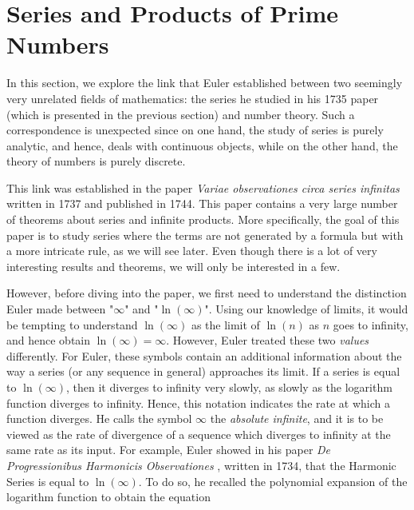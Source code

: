 \section{Series and Products of Prime Numbers}

In this section, we explore the link that Euler established between two seemingly very unrelated fields of mathematics: the series he studied in his 1735 paper (which is presented in the previous section) and number theory. Such a correspondence is unexpected since on one hand, the study of series is purely analytic, and hence, deals with continuous objects, while on the other hand, the theory of numbers is purely discrete.

This link was established in the paper \textit{Variae observationes circa series infinitas} \cite{euler1737variae} written in 1737 and published in 1744. This paper contains a very large number of theorems about series and infinite products. More specifically, the goal of this paper is to study series where the terms are not generated by a formula but with a more intricate rule, as we will see later. Even though there is a lot of very interesting results and theorems, we will only be interested in a few.

However, before diving into the paper, we first need to understand the distinction Euler made between "$\infty$" and "$\ln(\infty)$". Using our knowledge of limits, it would be tempting to understand $\ln(\infty)$ as the limit of $\ln(n)$ as $n$ goes to infinity, and hence obtain $\ln(\infty) = \infty$. However, Euler treated these two \textit{values} differently. For Euler, these symbols contain an additional information about the way a series (or any sequence in general) approaches its limit. If a series is equal to $\ln(\infty)$, then it diverges to infinity very slowly, as slowly as the logarithm function diverges to infinity. Hence, this notation indicates the rate at which a function diverges. He calls the symbol $\infty$ the \textit{absolute infinite}, and it is to be viewed as the rate of divergence of a sequence which diverges to infinity at the same rate as its input. For example, Euler showed in his paper \textit{De Progressionibus Harmonicis Observationes} \cite{euler1740progressionibus}, written in 1734, that the Harmonic Series is equal to $\ln(\infty)$. To do so, he recalled the polynomial expansion of the logarithm function to obtain the equation

